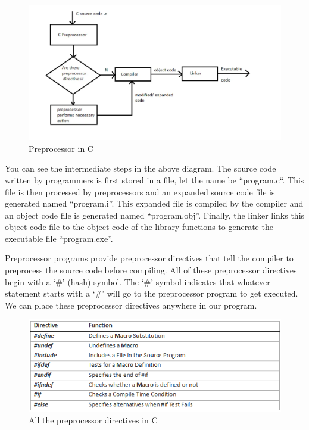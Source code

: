         \begin{figure}[!ht]
                \centering
                \captionsetup{justification=centering,margin=0.05cm}
                \includegraphics[width=0.8\columnwidth]{figures/preprocessor-in-c.png}
                \caption{\label{fig:preprocessor}Preprocessor in C}
        \end{figure}

        You can see the intermediate steps in the above diagram. The source code written by programmers is first stored in a file, let the name be “program.c“. This file is then processed by preprocessors and an expanded source code file is generated named “program.i”. This expanded file is compiled by the compiler and an object code file is generated named “program.obj”. Finally, the linker links this object code file to the object code of the library functions to generate the executable file “program.exe”. 

        Preprocessor programs provide preprocessor directives that tell the compiler to preprocess the source code before compiling. All of these preprocessor directives begin with a ‘\#’ (hash) symbol. The ‘\#’ symbol indicates that whatever statement starts with a ‘\#’ will go to the preprocessor program to get executed. We can place these preprocessor directives anywhere in our program.

        \begin{figure}[!ht]
                \centering
                \captionsetup{justification=centering,margin=0.05cm}
                \includegraphics[width=0.8\columnwidth]{figures/preprocessor-directives.png}
                \caption{\label{fig:preprocessor-directives}All the preprocessor directives in C}
        \end{figure}

